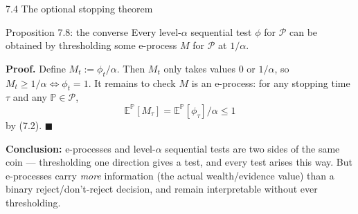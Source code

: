 \documentclass[aspectratio=169,10pt]{beamer}
\begin{document}
\begin{frame}[allowframebreaks]{7.4 The optional stopping theorem}
\framebreak

\begin{block}{Proposition 7.8: the converse}
Every level-$\alpha$ sequential test $\phi$ for $\mathcal P$ can be obtained by thresholding some e-process $M$ for
$\mathcal P$ at $1/\alpha$.
\end{block}

\textbf{Proof.} Define $M_t := \phi_t / \alpha$. Then $M_t$ only takes values $0$ or $1/\alpha$, so
$M_t \ge 1/\alpha \iff \phi_t = 1$. It remains to check $M$ is an e-process: for any stopping time $\tau$ and any
$\mathbb P \in \mathcal P$,
$$\mathbb{E}^{\mathbb P}[M_\tau] = \mathbb E^{\mathbb P}[\phi_\tau]/\alpha \le 1$$
by (7.2). $\blacksquare$

\textbf{Conclusion:} e-processes and level-$\alpha$ sequential tests are two sides of the same coin --- thresholding
one direction gives a test, and every test arises this way. But e-processes carry \emph{more} information (the
actual wealth/evidence value) than a binary reject/don't-reject decision, and remain interpretable without ever
thresholding.

\end{frame}
\end{document}
